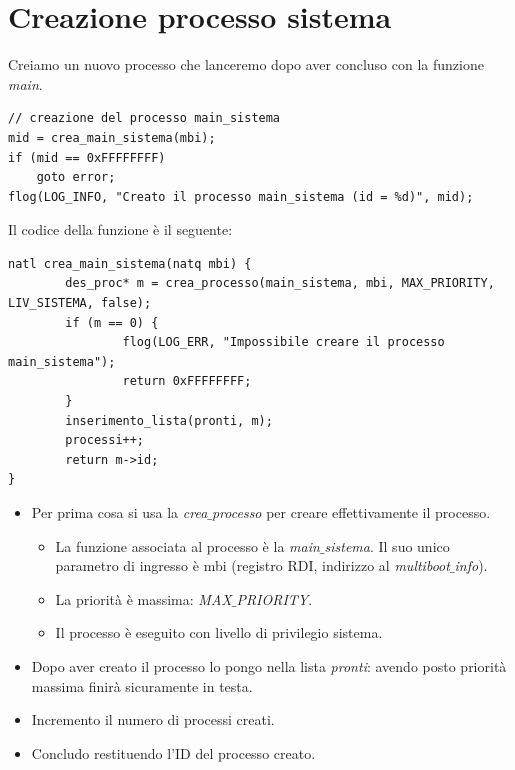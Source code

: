 \documentclass[11pt]{report}
\theoremstyle{definition}
\begin{document}
\section{Creazione processo sistema}
Creiamo un nuovo processo che lanceremo dopo aver concluso con la funzione \emph{main}.
\begin{verbatim}
// creazione del processo main_sistema
mid = crea_main_sistema(mbi);
if (mid == 0xFFFFFFFF)
    goto error;
flog(LOG_INFO, "Creato il processo main_sistema (id = %d)", mid);
\end{verbatim}
Il codice della funzione è il seguente:
\begin{verbatim}
natl crea_main_sistema(natq mbi) {
	    des_proc* m = crea_processo(main_sistema, mbi, MAX_PRIORITY, LIV_SISTEMA, false);
	    if (m == 0) {
		        flog(LOG_ERR, "Impossibile creare il processo main_sistema");
		        return 0xFFFFFFFF;
	    }
	    inserimento_lista(pronti, m);
	    processi++;
	    return m->id;
}
\end{verbatim}
\begin{itemize}
	\item Per prima cosa si usa la \emph{crea$\_$processo} per creare effettivamente il processo. 
	\begin{itemize}
		\item La funzione associata al processo è la \emph{main$\_$sistema}. Il suo unico parametro di ingresso è {mbi} (registro RDI, indirizzo al \emph{multiboot$\_$info}).
		\item La priorità è massima: \emph{MAX$\_$PRIORITY}.
		\item Il processo è eseguito con livello di privilegio sistema.
	\end{itemize}
\item Dopo aver creato il processo lo pongo nella lista \emph{pronti}: avendo posto priorità massima finirà sicuramente in testa.
\item Incremento il numero di processi creati.
\item Concludo restituendo l'ID del processo creato.
\end{itemize}
\end{document}
